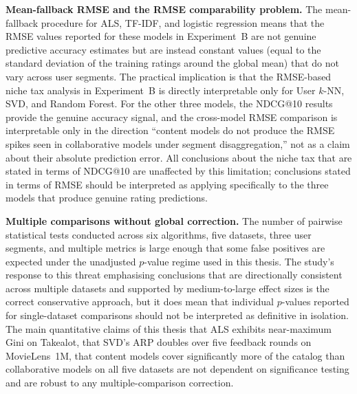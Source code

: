 \documentclass[11pt,a4paper]{report}
\begin{document}
\textbf{Mean-fallback RMSE and the RMSE comparability problem.} The mean-fallback procedure for ALS, TF-IDF, and logistic regression means that the RMSE values reported for these models in Experiment~B are not genuine predictive accuracy estimates but are instead constant values (equal to the standard deviation of the training ratings around the global mean) that do not vary across user segments. The practical implication is that the RMSE-based niche tax analysis in Experiment~B is directly interpretable only for User $k$-NN, SVD, and Random Forest. For the other three models, the NDCG@10 results provide the genuine accuracy signal, and the cross-model RMSE comparison is interpretable only in the direction ``content models do not produce the RMSE spikes seen in collaborative models under segment disaggregation,'' not as a claim about their absolute prediction error. All conclusions about the niche tax that are stated in terms of NDCG@10 are unaffected by this limitation; conclusions stated in terms of RMSE should be interpreted as applying specifically to the three models that produce genuine rating predictions.

\textbf{Multiple comparisons without global correction.} The number of pairwise statistical tests conducted across six algorithms, five datasets, three user segments, and multiple metrics is large enough that some false positives are expected under the unadjusted $p$-value regime used in this thesis. The study's response to this threat emphasising conclusions that are directionally consistent across multiple datasets and supported by medium-to-large effect sizes is the correct conservative approach, but it does mean that individual $p$-values reported for single-dataset comparisons should not be interpreted as definitive in isolation. The main quantitative claims of this thesis that ALS exhibits near-maximum Gini on Takealot, that SVD's ARP doubles over five feedback rounds on MovieLens~1M, that content models cover significantly more of the catalog than collaborative models on all five datasets are not dependent on significance testing and are robust to any multiple-comparison correction.
\end{document}
